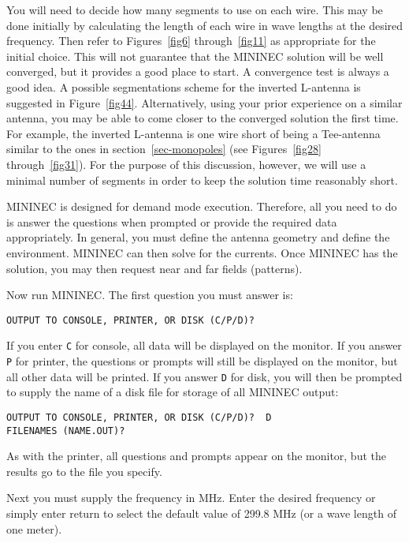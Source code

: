 \documentclass[12pt]{article}
\begin{document}
You will need to decide how many segments to use on each wire. This may
be done initially by calculating the length of each wire in wave lengths
at the desired frequency. Then refer to Figures~\ref{fig6}
through~\ref{fig11} as appropriate for the initial choice. This will not
guarantee that the MININEC solution will be well converged, but it
provides a good place to start. A convergence test is always a good
idea. A possible segmentations scheme for the inverted L-antenna is
suggested in Figure~\ref{fig44}. Alternatively, using your prior
experience on a similar antenna, you may be able to come closer to the
converged solution the first time. For example, the inverted L-antenna
is one wire short of being a Tee-antenna similar to the ones in
section~\ref{sec-monopoles} (see Figures~\ref{fig28} through~\ref{fig31}).
For the purpose of this discussion, however, we will use a minimal
number of segments in order to keep the solution time reasonably short.

MININEC is designed for demand mode execution. Therefore, all you need
to do is answer the questions when prompted or provide the required data
appropriately. In general, you must define the antenna geometry and
define the environment. MININEC can then solve for the currents. Once
MININEC has the solution, you may then request near and far fields
(patterns).

\noindent Now run MININEC. The first question you must answer is:

\begin{Verbatim}
OUTPUT TO CONSOLE, PRINTER, OR DISK (C/P/D)?
\end{Verbatim}

If you enter \verb+C+ for console, all data will be displayed on the
monitor. If you answer \verb+P+ for printer, the questions or prompts
will still be displayed on the monitor, but all other data will be
printed. If you answer \verb+D+ for disk, you will then be prompted to
supply the name of a disk file for storage of all MININEC output:

\begin{Verbatim}
OUTPUT TO CONSOLE, PRINTER, OR DISK (C/P/D)?  D
FILENAMES (NAME.OUT)?
\end{Verbatim}

As with the printer, all questions and prompts appear on the monitor,
but the results go to the file you specify.

Next you must supply the frequency in MHz. Enter the desired frequency
or simply enter return to select the default value of 299.8 MHz (or a
wave length of one meter).
\end{document}
